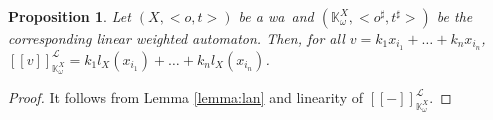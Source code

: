 \documentclass[3p]{elsarticle}
\newcommand{\fL}{\mathcal{L}}    %
\newcommand{\beh}[3]{\left[\!\left[ #1 \right]\!\right]^{#2}_{#3}} %
\newcommand{\Beh}[3]{\Big[\!\!\Big[ #1 \Big]\!\!\Big ]^{#2}_{#3}} %
\newcommand{\K}{\mathbb{K}}            %
\newcommand{\wa}{{\sc wa}}             %
\newtheorem{proposition}{Proposition}
\begin{document}
\begin{proposition}\label{prop:linearizationlanguage}
Let $(X,<o,t>)$ be a \wa\ and $(\K^X_{\omega},
<o^{\sharp},t^{\sharp}>)$ be the corresponding linear weighted
automaton. Then, for all $v=k_1x_{i_1} + \dots +k_nx_{i_n}$,
$\beh{v}{\fL}{\K^X_{\omega}}=k_1l_X(x_{i_1})+ \dots +
k_nl_X(x_{i_n})$.
\end{proposition}
%
%
%
%
%
\begin{proof}
It follows from Lemma \ref{lemma:lan} and linearity of $\beh{-}{\fL}{\K^X_{\omega}}$.
\end{proof}
\end{document}
